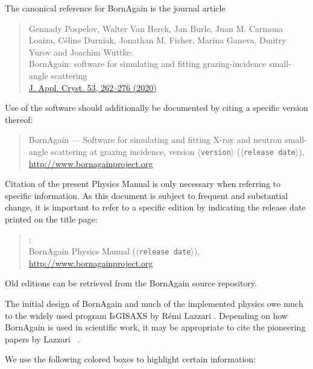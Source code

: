 %
The canonical reference for BornAgain is the journal article \cite{PoHB20}
\begin{quote}
Gennady Pospelov, Walter Van Herck, Jan Burle, Juan M. Carmona Loaiza,
Céline Durniak, Jonathan M. Fisher, Marina Ganeva, Dmitry Yurov and
Joachim Wuttke:\\
BornAgain: software for simulating and fitting
grazing-incidence small-angle scattering\\
\href{https://doi.org/10.1107/S1600576719016789}{J. Appl. Cryst. 53, 262–276 (2020)}
\end{quote}
Use of the software should additionally be documented by citing a specific version thereof:
\begin{quote}
BornAgain --- Software for simulating and fitting
X-ray and neutron small-angle scattering at grazing incidence,
version $\langle$\texttt{version}$\rangle$ ($\langle$\texttt{release date}$\rangle$),\\
\url{http://www.bornagainproject.org}
\end{quote}
Citation of the present Physics Manual is only necessary
when referring to specific information.
As this document is subject to frequent and substantial change,
it is important to refer to a specific edition by indicating the release date
printed on the title page:
\begin{quote}
\authors:\\
BornAgain Physics Manual ($\langle$\texttt{release date}$\rangle$),\\
\url{http://www.bornagainproject.org}
\end{quote}
Old editions can be retrieved from the BornAgain source repository.

The initial design of BornAgain and much of the implemented physics owe much
to the widely used program IsGISAXS
%
%
by R\'emi Lazzari \cite{Laz06}.
Depending on how BornAgain is used in scientific work,
it may be appropriate to cite the pioneering papers
by Lazzari \etal\ \cite{Laz02,ReLL09}.



We use the following colored boxes to highlight
certain information:

\def\demobox#1{\noindent\strut\hspace{.2\TW}\begin{minipage}{.75\textwidth}#1
\end{minipage}\hfill\strut}

